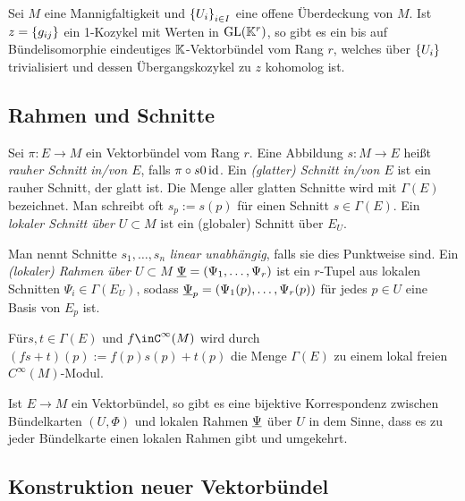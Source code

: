 \begin{satz}
  Sei $M$ eine Mannigfaltigkeit und $\left\lbrace U_i \right\rbrace_{i\in I}$ eine offene
  Überdeckung von $M$. Ist $z = \left\lbrace g_{ij} \right\rbrace$ ein 1-Kozykel mit Werten
  in $\operatorname{GL}(\mathbb{K}^r)$, so gibt es ein bis auf Bündelisomorphie eindeutiges $\mathbb{K}$-Vektorbündel vom Rang $r$,
  welches über $\left\lbrace U_i \right\rbrace$ trivialisiert und dessen Übergangskozykel
  zu $z$ kohomolog ist.
\end{satz}

\subsection*{Rahmen und Schnitte}

\begin{definition}
  Sei $\pi \colon E\to M$ ein Vektorbündel vom Rang $r$. Eine
  Abbildung $s\colon M \to E$ heißt \emph{rauher Schnitt in/von $E$}, falls
  $\pi\circ s 0 \operatorname{id}$. Ein \emph{(glatter) Schnitt in/von $E$} ist ein
  rauher Schnitt, der glatt ist. Die Menge aller glatten Schnitte wird
  mit $\Gamma(E)$ bezeichnet. Man schreibt oft $s_p := s(p)$ für einen
  Schnitt $s\in \Gamma(E)$. Ein \emph{lokaler Schnitt über $U\subset
    M$} ist ein (globaler) Schnitt über $E_U$.

  Man nennt Schnitte $s_1,\dots,s_n$ \emph{linear unabhängig}, falls
  sie dies Punktweise sind. Ein \emph{(lokaler) Rahmen  über $U\subset
    M$} $\underline{\Psi}
  = (\Psi_1,\dots,\Psi_r)$ ist ein $r$-Tupel aus lokalen Schnitten
  $\Psi_i \in \Gamma(E_U)$, sodass
  $\underline{\Psi}_p = (\Psi_1(p),\dots,\Psi_r(p))$ für jedes $p\in U$
  eine Basis von $E_p$ ist.
\end{definition}

\begin{proposition}
  Für$s,t\in\Gamma(E)$ und $f\inC^\infty(M)$ wird durch $(fs + t)(p)
  := f(p)s(p) + t(p)$ die Menge $\Gamma(E)$ zu einem lokal freien $C^\infty(M)$-Modul.
\end{proposition}

\begin{proposition}
  Ist $E\to M$ ein Vektorbündel, so gibt es eine bijektive
  Korrespondenz zwischen Bündelkarten $(U,\Phi)$ und lokalen Rahmen
  $\underline{\Psi}$ über $U$ in dem Sinne, dass es zu jeder Bündelkarte
  einen lokalen Rahmen gibt und umgekehrt.
\end{proposition}

\subsection*{Konstruktion neuer Vektorbündel}



